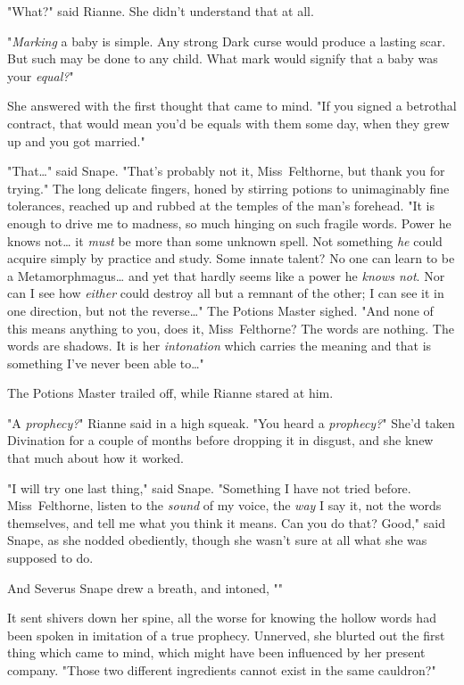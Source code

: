 "What?" said Rianne. She didn't understand that at all.

"\emph{Marking} a baby is simple. Any strong Dark curse would produce a lasting
scar. But such may be done to any child. What mark would signify that a baby
was your \emph{equal?}"

She answered with the first thought that came to mind. "If you signed a
betrothal contract, that would mean you'd be equals with them some day, when
they grew up and you got married."

"That{\ldots}" said Snape. "That's probably not it, Miss~Felthorne, but thank
you for trying." The long delicate fingers, honed by stirring potions to
unimaginably fine tolerances, reached up and rubbed at the temples of the man's
forehead. "It is enough to drive me to madness, so much hinging on such fragile
words. Power he knows not{\ldots} it \emph{must} be more than some unknown
spell. Not something \emph{he} could acquire simply by practice and study. Some
innate talent? No one can learn to be a Metamorphmagus{\ldots} and yet that
hardly seems like a power he \emph{knows not}. Nor can I see how \emph{either}
could destroy all but a remnant of the other; I can see it in one direction,
but not the reverse{\ldots}" The Potions Master sighed. "And none of this means
anything to you, does it, Miss~Felthorne? The words are nothing. The words are
shadows. It is her \emph{intonation} which carries the meaning and that is
something I've never been able to{\ldots}"

The Potions Master trailed off, while Rianne stared at him.

"A \emph{prophecy?}" Rianne said in a high squeak. "You heard a
\emph{prophecy?}" She'd taken Divination for a couple of months before dropping
it in disgust, and she knew that much about how it worked.

"I will try one last thing," said Snape. "Something I have not tried before.
Miss~Felthorne, listen to the \emph{sound} of my voice, the \emph{way} I say
it, not the words themselves, and tell me what you think it means. Can
you do that? Good," said Snape, as she nodded obediently, though she wasn't
sure at all what she was supposed to do.

And Severus Snape drew a breath, and intoned, ""

It sent shivers down her spine, all the worse for knowing the hollow words had
been spoken in imitation of a true prophecy. Unnerved, she blurted out the
first thing which came to mind, which might have been influenced by her present
company. "Those two different ingredients cannot exist in the same cauldron?"


